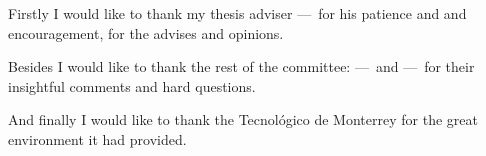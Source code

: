 \providecommand{\theAdvisor}{---}
\providecommand{\committeeA}{---}
\providecommand{\director}{---}

Firstly I would like to thank my thesis adviser \theAdvisor\
for his patience and and encouragement, for the advises and opinions.

Besides I would like to thank the rest of the committee:
\committeeA\ and \director\
for their insightful comments and hard questions.

And finally I would like to thank the Tecnol\'{o}gico de Monterrey for the
great environment it had provided.
